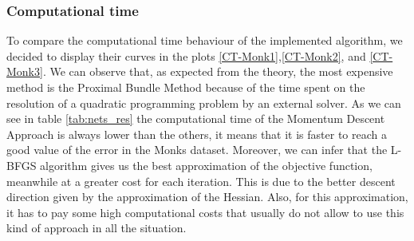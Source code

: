 \subsubsection{Computational time}
To compare the computational time behaviour of the implemented algorithm, we decided to display their curves in the plots \ref{CT-Monk1},\ref{CT-Monk2}, and \ref{CT-Monk3}. We can observe that, as expected from the theory, the most expensive method is the Proximal Bundle Method because of the time spent on the resolution of a quadratic programming problem by an external solver. As we can see in table \ref{tab:nets_res} the computational time of the Momentum Descent Approach is always lower than the others, it means that it is faster to reach a good value of the error in the Monks dataset. Moreover, we can infer that the L-BFGS algorithm gives us the best approximation of the objective function, meanwhile at a greater cost for each iteration. This is due to the better descent direction given by the approximation of the Hessian. Also, for this approximation, it has to pay some high computational costs that usually do not allow to use this kind of approach in all the situation. 

